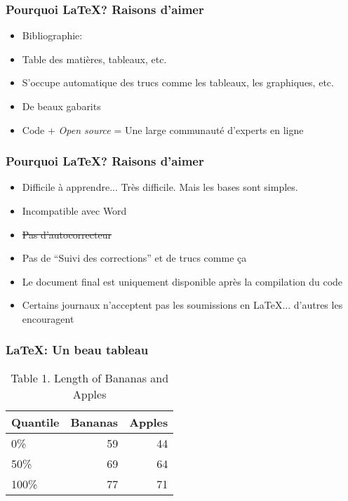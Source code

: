 \documentclass{beamer}
\begin{document}
    \begin{frame}
        \frametitle{Pourquoi \LaTeX? Raisons d'aimer} \vspace{1cm}
        \begin{itemize}
           \item{Bibliographie: \BibTeX}
           \item{Table des matières, tableaux, etc.}
           \item{S'occupe automatique des trucs comme les tableaux, les graphiques, etc.}
           \item{De beaux gabarits}
           \item{Code + \emph{Open source} = Une large communauté d'experts en ligne}
        \end{itemize} 
    \end{frame}
    
    \begin{frame}
        \frametitle{Pourquoi \LaTeX? Raisons d'aimer} \vspace{1cm}
        \begin{itemize}
           \item{Difficile à apprendre... Très difficile. Mais les bases sont simples.}
           \item{Incompatible avec Word}
           \item{\sout{Pas d'autocorrecteur}}
           \item{Pas de ``Suivi des corrections'' et de trucs comme ça}
           \item{Le document final est uniquement disponible après la compilation du code}
           \item{Certains journaux n'acceptent pas les soumissions en \LaTeX{}... d'autres les encouragent}
        \end{itemize} 
    \end{frame}

    \begin{frame}
        \frametitle{\LaTeX: Un beau tableau} \vspace{1cm}   
            \begin{table}
              \centering
              \normalsize
              \caption{\large{Table 1. Length of Bananas and Apples}}
              \begin{tabular}{lrr}
                  Quantile & Bananas & Apples\\\hline 
                  0\% & 59 & 44\\
                  50\% &69&64\\
                  100\% & 77 & 71\\
              \end{tabular}
              \label{tab:bananespommes}
            \end{table}  
    \end{frame}
    
\end{document}
